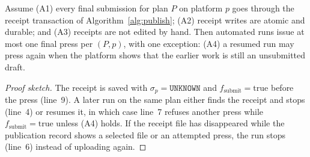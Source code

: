 \begin{proposition}
\label{prop:idempotency}
Assume (A1) every final submission for plan $P$ on platform $p$ goes through the receipt transaction of Algorithm~\ref{alg:publish}; (A2) receipt writes are atomic and durable; and (A3) receipts are not edited by hand. Then automated runs issue at most one final press per $(P, p)$, with one exception: (A4) a resumed run may press again when the platform shows that the earlier work is still an unsubmitted draft.
\end{proposition}
\begin{proof}[Proof sketch]
The receipt is saved with $\sigma_p = \texttt{UNKNOWN}$ and $f_{\text{submit}} = \text{true}$ before the press (line~9). A later run on the same plan either finds the receipt and stops (line~4) or resumes it, in which case line~7 refuses another press while $f_{\text{submit}} = \text{true}$ unless (A4) holds. If the receipt file has disappeared while the publication record shows a selected file or an attempted press, the run stops (line~6) instead of uploading again.
\end{proof}
